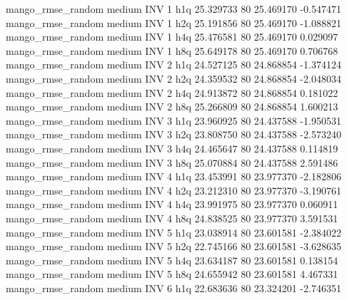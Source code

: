 mango_rmse_random     medium      INV                 1                  h1q 25.329733 80      25.469170          -0.547471
mango_rmse_random     medium      INV                 1                  h2q 25.191856 80      25.469170          -1.088821
mango_rmse_random     medium      INV                 1                  h4q 25.476581 80      25.469170           0.029097
mango_rmse_random     medium      INV                 1                  h8q 25.649178 80      25.469170           0.706768
mango_rmse_random     medium      INV                 2                  h1q 24.527125 80      24.868854          -1.374124
mango_rmse_random     medium      INV                 2                  h2q 24.359532 80      24.868854          -2.048034
mango_rmse_random     medium      INV                 2                  h4q 24.913872 80      24.868854           0.181022
mango_rmse_random     medium      INV                 2                  h8q 25.266809 80      24.868854           1.600213
mango_rmse_random     medium      INV                 3                  h1q 23.960925 80      24.437588          -1.950531
mango_rmse_random     medium      INV                 3                  h2q 23.808750 80      24.437588          -2.573240
mango_rmse_random     medium      INV                 3                  h4q 24.465647 80      24.437588           0.114819
mango_rmse_random     medium      INV                 3                  h8q 25.070884 80      24.437588           2.591486
mango_rmse_random     medium      INV                 4                  h1q 23.453991 80      23.977370          -2.182806
mango_rmse_random     medium      INV                 4                  h2q 23.212310 80      23.977370          -3.190761
mango_rmse_random     medium      INV                 4                  h4q 23.991975 80      23.977370           0.060911
mango_rmse_random     medium      INV                 4                  h8q 24.838525 80      23.977370           3.591531
mango_rmse_random     medium      INV                 5                  h1q 23.038914 80      23.601581          -2.384022
mango_rmse_random     medium      INV                 5                  h2q 22.745166 80      23.601581          -3.628635
mango_rmse_random     medium      INV                 5                  h4q 23.634187 80      23.601581           0.138154
mango_rmse_random     medium      INV                 5                  h8q 24.655942 80      23.601581           4.467331
mango_rmse_random     medium      INV                 6                  h1q 22.683636 80      23.324201          -2.746351
